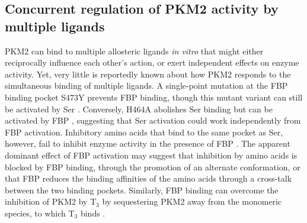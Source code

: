 \subsection{Concurrent regulation of PKM2 activity by multiple ligands}
PKM2 can bind to multiple allosteric ligands \textit{in vitro} that might either reciprocally influence each other's action, or exert independent effects on enzyme activity. Yet, very little is reportedly known about how PKM2 responds to the simultaneous binding of multiple ligands. A single-point mutation at the FBP binding pocket S473Y prevents FBP binding, though this mutant variant can still be activated by Ser \cite{Chaneton:2012aa}. Conversely, H464A abolishes Ser binding but can be activated by FBP \cite{Chaneton:2012aa}, suggesting that Ser activation could work independently from FBP activation. Inhibitory amino acids that bind to the same pocket as Ser, however, fail to inhibit enzyme activity in the presence of FBP \cite{Yuan:2018aa,Sparmann:1973aa}. The apparent dominant effect of FBP activation may suggest that inhibition by amino acids is blocked by FBP binding, through the promotion of an alternate conformation, or that FBP reduces the binding affinities of the amino acids through a cross-talk between the two binding pockets. Similarly, FBP binding can overcome the inhibition of PKM2 by T$_{3}$ by sequestering PKM2 away from the monomeric species, to which T$_{3}$ binds \cite{Kato:1989aa,Ashizawa:1991aa}. 
%
%
\\\\
%
%
